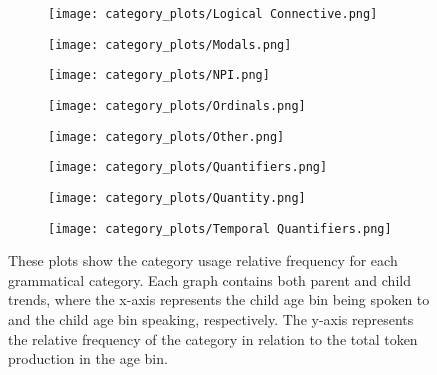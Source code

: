 \documentclass{article}
\theoremstyle{plain}
\theoremstyle{definition}
\theoremstyle{remark}
\numberwithin{equation}{section}
\begin{document}
\begin{figure}
\hfill
\begin{subfigure}[b]{0.3\textwidth}
    \centering
    \texttt{[image: category\_plots/Logical Connective.png]}
    \caption{}\label{fig:log}
\end{subfigure}
\hfill
\begin{subfigure}[b]{0.3\textwidth}
    \centering
    \texttt{[image: category\_plots/Modals.png]}
    \caption{}\label{fig:mod}
\end{subfigure}
\hfill
\begin{subfigure}[b]{0.3\textwidth}
    \centering
    \texttt{[image: category\_plots/NPI.png]}
    \caption{}\label{fig:npi}
\end{subfigure}
\hfill
\begin{subfigure}[b]{0.3\textwidth}
    \centering
    \texttt{[image: category\_plots/Ordinals.png]}
    \caption{}\label{fig:ord}
\end{subfigure}
\hfill
\begin{subfigure}[b]{0.3\textwidth}
    \centering
    \texttt{[image: category\_plots/Other.png]}
    \caption{}\label{fig:other}
\end{subfigure}
\hfill
\begin{subfigure}[b]{0.3\textwidth}
    \centering
    \texttt{[image: category\_plots/Quantifiers.png]}
    \caption{}\label{fig:quant}
\end{subfigure}
\hfill
\begin{subfigure}[b]{0.3\textwidth}
    \centering
    \texttt{[image: category\_plots/Quantity.png]}
    \caption{}\label{fig:num}
\end{subfigure}
\hfill
\begin{subfigure}[b]{0.3\textwidth}
    \centering
    \texttt{[image: category\_plots/Temporal Quantifiers.png]}
    \caption{}
    \label{fig:temp}
\end{subfigure}
\caption{These plots show the category usage relative frequency for each grammatical category. Each graph contains both parent and child trends, where the x-axis represents the child age bin being spoken to and the child age bin speaking, respectively. The y-axis represents the relative frequency of the category in relation to the total token production in the age bin.}
    \label{fig:category}
\end{figure}
\end{document}
